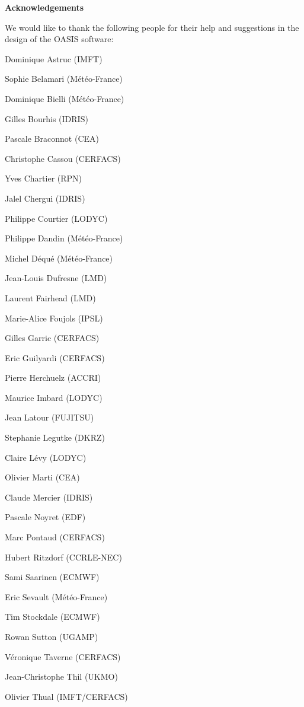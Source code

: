 \newpage
\vspace*{3cm}
\centerline{\bf Acknowledgements}
\vspace*{2cm}
We would like to thank the following people for their help
and suggestions in the design of the OASIS software:

\begin{description}
  \item Dominique Astruc (IMFT)
  \item Sophie Belamari (M\'et\'eo-France)
  \item Dominique Bielli (M\'et\'eo-France)
  \item Gilles Bourhis (IDRIS)
  \item Pascale Braconnot (CEA)
  \item Christophe Cassou (CERFACS)
  \item Yves Chartier (RPN)
  \item Jalel Chergui (IDRIS)
  \item Philippe Courtier (LODYC)
  \item Philippe Dandin (M\'et\'eo-France)
  \item Michel D\'equ\'e (M\'et\'eo-France)
  \item Jean-Louis Dufresne (LMD)
  \item Laurent Fairhead (LMD)
  \item Marie-Alice Foujols (IPSL)
  \item Gilles Garric (CERFACS)
  \item Eric Guilyardi (CERFACS)
  \item Pierre Herchuelz (ACCRI)
  \item Maurice Imbard (LODYC)
  \item Jean Latour (FUJITSU)
  \item Stephanie Legutke (DKRZ)
  \item Claire L\'evy (LODYC)
  \item Olivier Marti (CEA)
  \item Claude Mercier (IDRIS)
  \item Pascale Noyret (EDF)
  \item Marc Pontaud (CERFACS)
  \item Hubert Ritzdorf (CCRLE-NEC)
  \item Sami Saarinen (ECMWF)
  \item Eric Sevault (M\'et\'eo-France)
  \item Tim Stockdale (ECMWF)
  \item Rowan Sutton (UGAMP)
  \item V\'eronique Taverne (CERFACS)
  \item Jean-Christophe Thil (UKMO)
  \item Olivier Thual (IMFT/CERFACS)
\end{description}

